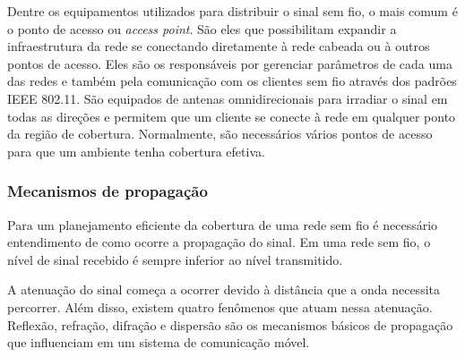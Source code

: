 \documentclass[tc,twoside]{iiufrgs}
\begin{document}
Dentre os equipamentos utilizados para distribuir o sinal sem fio, o mais comum é o ponto de acesso ou \textit{access point}. São eles que possibilitam expandir a infraestrutura da rede se conectando diretamente à rede cabeada ou à outros pontos de acesso. Eles são os responsáveis por gerenciar parâmetros de cada uma das redes e também pela comunicação com os clientes sem fio através dos padrões IEEE 802.11. São equipados de antenas omnidirecionais para irradiar o sinal em todas as direções e permitem que um cliente se conecte à rede em qualquer ponto da região de cobertura. Normalmente, são necessários vários pontos de acesso para que um ambiente tenha cobertura efetiva. \cite{sanches2005projetando} \cite{torres2015redes} %

\subsubsection{Mecanismos de propagação}

Para um planejamento eficiente da cobertura de uma rede sem fio é necessário entendimento de como ocorre a propagação do sinal. Em uma rede sem fio, o nível de sinal recebido é sempre inferior ao nível transmitido. \cite{rappaport2009comunicacoes} %

A atenuação do sinal começa a ocorrer devido à distância que a onda necessita percorrer. Além disso, existem quatro fenômenos que atuam nessa atenuação. Reflexão, refração, difração e dispersão são os mecanismos básicos de propagação que influenciam em um sistema de comunicação móvel. \cite{rappaport2009comunicacoes} %
\end{document}
